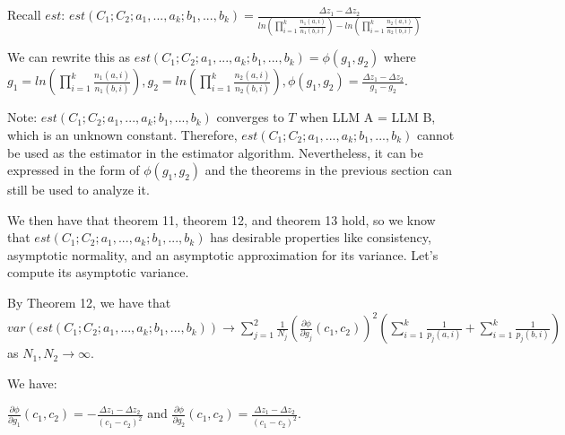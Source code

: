 \documentclass{article}
\begin{document}
Recall $\displaystyle est$: $\displaystyle est\left( C_{1} ;C_{2} ;a_{1} ,...,a_{k} ;b_{1} ,...,b_{k}\right) =\frac{\Delta z_{1} -\Delta z_{2}}{ln\left(\prod _{i=1}^{k}\frac{n_{1}\left( a,i\right)}{n_{1}\left( b,i\right)}\right) -ln\left(\prod _{i=1}^{k}\frac{n_{2}\left( a,i\right)}{n_{2}\left( b,i\right)}\right)}$



We can rewrite this as $\displaystyle est\left( C_{1} ;C_{2} ;a_{1} ,...,a_{k} ;b_{1} ,...,b_{k}\right) =\phi \left( g_{1} ,g_{2}\right)$ where $\displaystyle g_{1} =ln\left(\prod _{i=1}^{k}\frac{n_{1}\left( a,i\right)}{n_{1}\left( b,i\right)}\right) ,g_{2} =ln\left(\prod _{i=1}^{k}\frac{n_{2}\left( a,i\right)}{n_{2}\left( b,i\right)}\right) ,\phi \left( g_{1} ,g_{2}\right) =\frac{\Delta z_{1} -\Delta z_{2}}{g_{1} -g_{2}}$.



Note: $\displaystyle est\left( C_{1} ;C_{2} ;a_{1} ,...,a_{k} ;b_{1} ,...,b_{k}\right)$ converges to $\displaystyle T$ when LLM A = LLM B, which is an unknown constant. Therefore, $\displaystyle est\left( C_{1} ;C_{2} ;a_{1} ,...,a_{k} ;b_{1} ,...,b_{k}\right)$ cannot be used as the estimator in the estimator algorithm. Nevertheless, it can be expressed in the form of $\displaystyle \phi \left( g_{1} ,g_{2}\right)$ and the theorems in the previous section can still be used to analyze it.



We then have that theorem 11, theorem 12, and theorem 13 hold, so we know that $\displaystyle est\left( C_{1} ;C_{2} ;a_{1} ,...,a_{k} ;b_{1} ,...,b_{k}\right)$ has desirable properties like consistency, asymptotic normality, and an asymptotic approximation for its variance. Let's compute its asymptotic variance.



By Theorem 12, we have that $\displaystyle var\left( est\left( C_{1} ;C_{2} ;a_{1} ,...,a_{k} ;b_{1} ,...,b_{k}\right)\right)\rightarrow \sum _{j=1}^{2}\frac{1}{N_{j}}\left(\frac{\partial \phi }{\partial g_{j}}\left( c_{1} ,c_{2}\right)\right)^{2}\left(\sum _{i=1}^{k}\frac{1}{p_{j}\left( a,i\right)} +\sum _{i=1}^{k}\frac{1}{p_{j}\left( b,i\right)}\right)$ as $\displaystyle N_{1} ,N_{2}\rightarrow \infty $.

We have:

$\displaystyle \frac{\partial \phi }{\partial g_{1}}\left( c_{1} ,c_{2}\right) =-\frac{\Delta z_{1} -\Delta z_{2}}{\left( c_{1} -c_{2}\right)^{2}}$ and $\displaystyle \frac{\partial \phi }{\partial g_{2}}\left( c_{1} ,c_{2}\right) =\frac{\Delta z_{1} -\Delta z_{2}}{\left( c_{1} -c_{2}\right)^{2}}$.
\end{document}
